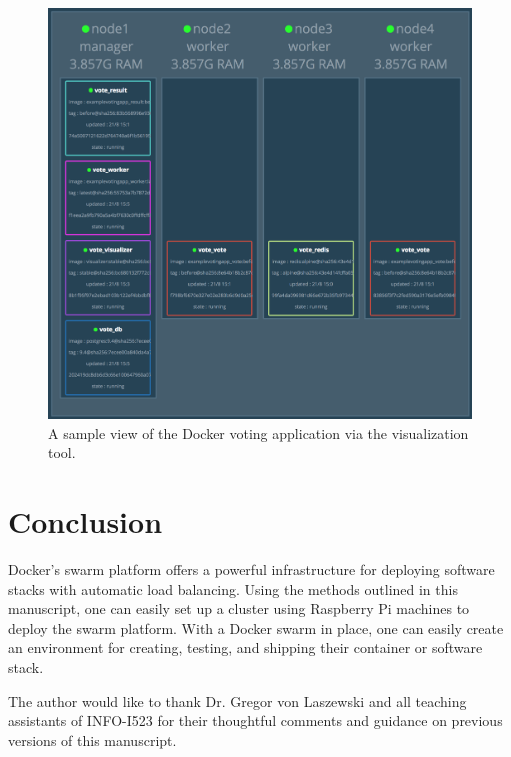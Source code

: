 \documentclass[sigconf]{acmart}
\begin{document}
\begin{figure}[!ht]
  \centering\includegraphics[width=\columnwidth]{images/votingApp2.png}
  \caption{A sample view of the Docker voting application via the  visualization tool.}\label{f:votingApp2}
\end{figure}

\section{Conclusion}

Docker's swarm platform offers a powerful infrastructure for deploying software stacks with automatic load balancing. Using the methods outlined in this manuscript, one can easily set up a cluster using Raspberry Pi machines to deploy the swarm platform. With a Docker swarm in place, one can easily create an environment for creating, testing, and shipping their container or software stack.


\begin{acks}

The author would like to thank Dr. Gregor von Laszewski and all teaching assistants of INFO-I523 for their thoughtful comments and guidance on previous versions of this manuscript.

\end{acks}


 
\end{document}
